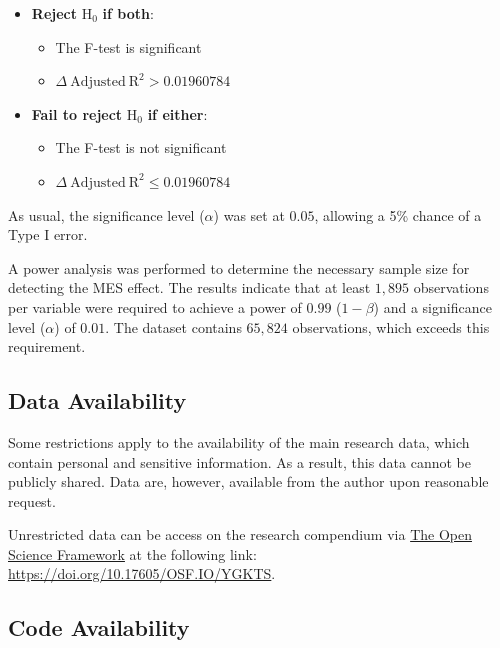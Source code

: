 \documentclass[
12pt,
openright,
oneside,
a4paper,
chapter=TITLE,
section=TITLE,
french,
spanish,
brazil,
english
]{abntex2}
\providecommand{\tightlist}{
\setlength{\itemsep}{0ex}\setlength{\parskip}{0\baselineskip}}
\begin{document}
\begin{itemize}
\tightlist
\item
  \textbf{Reject} \(\text{H}_{0}\) \textbf{if both}:

  \begin{itemize}
  \tightlist
  \item
    The F-test is significant
  \item
    \(\Delta \ \text{Adjusted} \ \text{R}^{2} > 0.01960784\)
  \end{itemize}
\item
  \textbf{Fail to reject} \(\text{H}_{0}\) \textbf{if either}:

  \begin{itemize}
  \tightlist
  \item
    The F-test is not significant
  \item
    \(\Delta \ \text{Adjusted} \ \text{R}^{2} \leq 0.01960784\)
  \end{itemize}
\end{itemize}

As usual, the significance level (\(\alpha\)) was set at \(0.05\),
allowing a 5\% chance of a Type I error.

A power analysis was performed to determine the necessary sample size
for detecting the MES effect. The results indicate that at least
\(1,895\) observations per variable were required to achieve a power of
\(0.99\) (\(1 - \beta\)) and a significance level (\(\alpha\)) of
\(0.01\). The dataset contains \(65,824\) observations, which exceeds
this requirement.

\subsection{Data Availability}\label{data-availability}

Some restrictions apply to the availability of the main research data,
which contain personal and sensitive information. As a result, this data
cannot be publicly shared. Data are, however, available from the author
upon reasonable request.

Unrestricted data can be access on the research compendium via
\href{https://osf.io/}{The Open Science Framework} at the following
link: \url{https://doi.org/10.17605/OSF.IO/YGKTS}.

\subsection{Code Availability}\label{code-availability}
\end{document}
